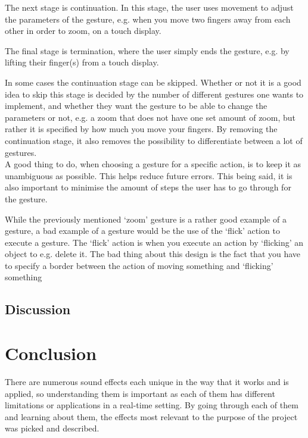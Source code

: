 The next stage is continuation. In this stage, the user uses movement to adjust the parameters of the gesture, e.g. when you move two fingers away from each other in order to zoom, on a touch display.

The final stage is termination, where the user simply ends the gesture, e.g. by lifting their finger(s) from a touch display.

In some cases the continuation stage can be skipped. Whether or not it is a good idea to skip this stage is decided by the number of different gestures one wants to implement, and whether they want the gesture to be able to change the parameters or not, e.g. a zoom that does not have one set amount of zoom, but rather it is specified by how much you move your fingers. By removing the continuation stage, it also removes the possibility to differentiate between a lot of gestures. \\

A good thing to do, when choosing a gesture for a specific action, is to keep it as unambiguous as possible. This helps reduce future errors. This being said, it is also important to minimise the amount of steps the user has to go through for the gesture.

While the previously mentioned ‘zoom’ gesture is a rather good example of a gesture, a bad example of a gesture would be the use of the ‘flick’ action to execute a gesture. The ‘flick’ action is when you execute an action by ‘flicking’ an object to e.g. delete it. The bad thing about this design is the fact that you have to specify a border between the action of moving something and ‘flicking’ something

\subsection{Discussion}




\section{Conclusion}

There are numerous sound effects each unique in the way that it works and is applied, so understanding them is important as each of them has different limitations or applications in a real-time setting.
By going through each of them and learning about them, the effects most relevant to the purpose of the project was picked and described.\\

